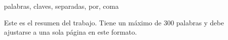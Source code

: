 
\begin{resumen}{palabras, claves, separadas, por, coma}

Este es el resumen del trabajo. Tiene un máximo de 300 palabras y debe ajustarse a una sola página en este formato.

\lipsum[1-2]

\end{resumen}